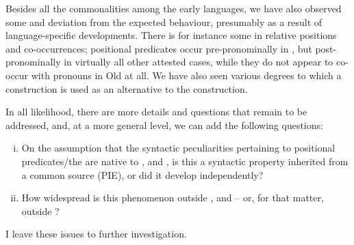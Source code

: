 \documentclass[output=paper,colorlinks,citecolor=brown]{langscibook}
\begin{document}
Besides all the commonalities among the early  languages, we have also observed some  and deviation from the expected behaviour, presumably as a result of language-specific developments. There is for instance some  in relative positions and co-occurrences; positional predicates occur pre-pronominally in , but post-pronominally in virtually all  other attested cases, while they do not appear to co-occur with pronouns in Old  at all. We have also seen various degrees to which a  construction is used as an alternative to the  construction. 

In all likelihood, there are more details and questions that remain to be addressed, and, at a more general level, we can add the following questions: 


\begin{enumerate}[(i)]
     \item On the assumption that the syntactic peculiarities pertaining to positional predicates/the  are native to ,   and , is this a syntactic property inherited from a common source (PIE), or did it develop independently? 
     \item How widespread is this phenomenon outside ,   and  -- or, for that matter, outside ? 
\end{enumerate} 

I leave these issues to further investigation. 
\end{document}
